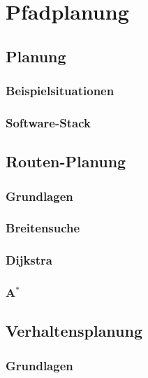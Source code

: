 \documentclass[a4paper]{article}
\title{\docTitle}
\author{Moritz}
\date{\today}
\begin{document}
\maketitle
\tableofcontents


\section{Pfadplanung}

\subsection{Planung}

\subsubsection{Beispielsituationen}

\subsubsection{Software-Stack}

\subsection{Routen-Planung}

\subsubsection{Grundlagen}

\subsubsection{Breitensuche}

\subsubsection{Dijkstra}

\subsubsection{A$^*$}

\subsection{Verhaltensplanung}

\subsubsection{Grundlagen}
\end{document}
